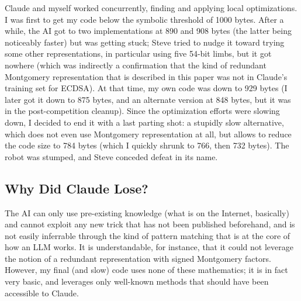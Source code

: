 \documentclass{llncs}
\begin{document}
Claude and myself worked concurrently, finding and applying local
optimizations. I was first to get my code below the symbolic threshold
of 1000 bytes. After a while, the AI got to two implementations at 890
and 908 bytes (the latter being noticeably faster) but was getting
stuck; Steve tried to nudge it toward trying some other representations,
in particular using five 54-bit limbs, but it got nowhere (which was
indirectly a confirmation that the kind of redundant Montgomery
representation that is described in this paper was not in Claude's
training set for ECDSA). At that time, my own code was down to 929 bytes
(I later got it down to 875 bytes, and an alternate version at 848
bytes, but it was in the post-competition cleanup). Since the
optimization efforts were slowing down, I decided to end it with a last
parting shot: a stupidly slow alternative, which does not even use
Montgomery representation at all, but allows to reduce the code size to
784 bytes (which I quickly shrunk to 766, then 732 bytes). The robot was
stumped, and Steve conceded defeat in its name.

\subsection{Why Did Claude Lose?}

The AI can only use pre-existing knowledge (what is on the Internet,
basically) and cannot exploit any new trick that has not been published
beforehand, and is not easily inferrable through the kind of pattern
matching that is at the core of how an LLM works. It is understandable,
for instance, that it could not leverage the notion of a redundant
representation with signed Montgomery factors. However, my final (and
slow) code uses none of these mathematics; it is in fact very basic, and
leverages only well-known methods that should have been accessible to
Claude.
\end{document}
